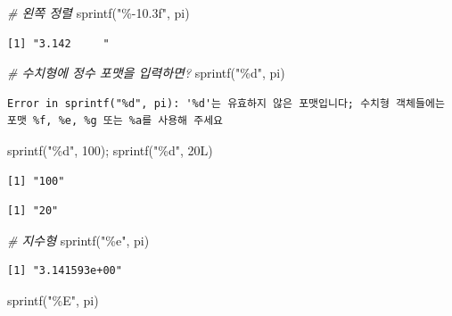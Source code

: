 \documentclass[
  11pt,
]{krantz}
\newenvironment{Shaded}{\begin{snugshade}}{\end{snugshade}}
\newcommand{\CommentTok}[1]{\textcolor[rgb]{0.37,0.37,0.37}{\textit{#1}}}
\newcommand{\DecValTok}[1]{\textcolor[rgb]{0.06,0.06,0.06}{#1}}
\newcommand{\FunctionTok}[1]{\textcolor[rgb]{0,0,0}{#1}}
\newcommand{\NormalTok}[1]{#1}
\newcommand{\StringTok}[1]{\textcolor[rgb]{0.5,0.5,0.5}{#1}}
\begin{document}
\begin{Shaded}
\begin{Highlighting}[]
\CommentTok{\# 왼쪽 정렬}
\FunctionTok{sprintf}\NormalTok{(}\StringTok{"\%{-}10.3f"}\NormalTok{, pi)}
\end{Highlighting}
\end{Shaded}

\begin{verbatim}
[1] "3.142     "
\end{verbatim}

\begin{Shaded}
\begin{Highlighting}[]
\CommentTok{\# 수치형에 정수 포맷을 입력하면?}
\FunctionTok{sprintf}\NormalTok{(}\StringTok{"\%d"}\NormalTok{, pi)}
\end{Highlighting}
\end{Shaded}

\begin{verbatim}
Error in sprintf("%d", pi): '%d'는 유효하지 않은 포맷입니다; 수치형 객체들에는 포맷 %f, %e, %g 또는 %a를 사용해 주세요
\end{verbatim}

\begin{Shaded}
\begin{Highlighting}[]
\FunctionTok{sprintf}\NormalTok{(}\StringTok{"\%d"}\NormalTok{, }\DecValTok{100}\NormalTok{); }\FunctionTok{sprintf}\NormalTok{(}\StringTok{"\%d"}\NormalTok{, 20L)}
\end{Highlighting}
\end{Shaded}

\begin{verbatim}
[1] "100"
\end{verbatim}

\begin{verbatim}
[1] "20"
\end{verbatim}

\begin{Shaded}
\begin{Highlighting}[]
\CommentTok{\# 지수형}
\FunctionTok{sprintf}\NormalTok{(}\StringTok{"\%e"}\NormalTok{, pi)}
\end{Highlighting}
\end{Shaded}

\begin{verbatim}
[1] "3.141593e+00"
\end{verbatim}

\begin{Shaded}
\begin{Highlighting}[]
\FunctionTok{sprintf}\NormalTok{(}\StringTok{"\%E"}\NormalTok{, pi)}
\end{Highlighting}
\end{Shaded}
\end{document}
